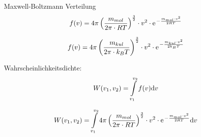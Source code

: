 Maxwell-Boltzmann Verteilung
\[ f(v)=4\pi \left(\frac{m_{mol}}{2\pi \cdot RT}\right)^{\frac32} \cdot v^2 \cdot \mathrm{e\;\!}^{-\frac{m_{mol} \cdot v^2}{2RT}}\]

\[ f(v)= 4\pi \left(\frac{m_{kul}}{2\pi \cdot k_{B}T}\right)^{\frac32} \cdot v^2 \cdot \mathrm{e\;\!}^{-\frac{m_{kul} \cdot v^2}{2k_{B}T}}\]

Wahrscheinlichkeitsdichte:
\[ W(v_{1},v_{2})= \int\limits_{v_{1}}^{v_{2}} f(v)\mathrm{d} v\]

\[ W(v_{1},v_{2})= \int\limits_{v_{1}}^{v_{2}} 4\pi \left(\frac{m_{mol}}{2\pi \cdot RT}\right)^{\frac32} \cdot v^2 \cdot \mathrm{e\;\!}^{-\frac{m_{mol} \cdot v^2}{2RT}}\mathrm{d} v\]
